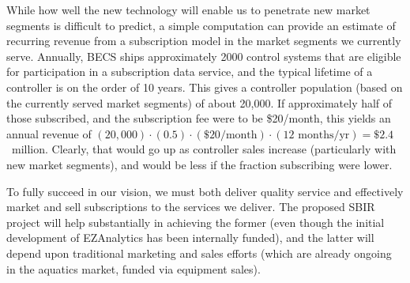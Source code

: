 While how well the new technology will enable us to penetrate new
market segments is difficult to predict, a simple computation can provide
an estimate of recurring revenue from a subscription model in the
market segments we currently serve.
Annually, BECS ships approximately 2000 control systems that are
eligible for participation in a subscription data service, and the
typical lifetime of a controller is on the order of 10 years.  This gives
a controller population (based on the currently served market segments) of
about 20,000.  If approximately half of those subscribed, and the subscription
fee were to be \$20/month, this yields an annual revenue of
$(20,000)\cdot(0.5)\cdot(\$20/\mbox{month})\cdot(12\mbox{ months/yr}) = \$2.4$~million.
Clearly, that would go up as controller sales increase (particularly with
new market segments), and would be less if the fraction subscribing
were lower.

To fully succeed in our vision, we must both deliver quality service
and effectively market and sell subscriptions to the services we
deliver.  The proposed SBIR project will help substantially in achieving
the former (even though the initial development of EZAnalytics\texttrademark{}
has been internally funded), and the latter will depend upon traditional
marketing and sales efforts (which are already ongoing in the aquatics
market, funded via equipment sales).
